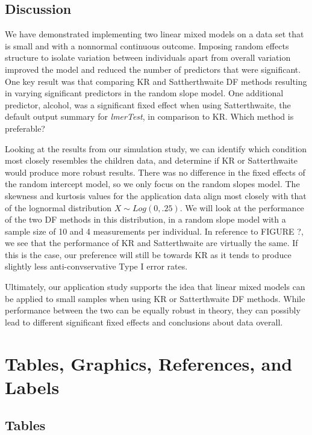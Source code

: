 \documentclass[12pt, twoside]{amherstthesis}
\begin{document}
\hypertarget{discussion-1}{%
\section{Discussion}\label{discussion-1}}

We have demonstrated implementing two linear mixed models on a data set that is small and with a nonnormal continuous outcome. Imposing random effects structure to isolate variation between individuals apart from overall variation improved the model and reduced the number of predictors that were significant. One key result was that comparing KR and Sattherthwaite DF methods resulting in varying significant predictors in the random slope model. One additional predictor, alcohol, was a significant fixed effect when using Satterthwaite, the default output summary for \emph{lmerTest}, in comparison to KR. Which method is preferable?

Looking at the results from our simulation study, we can identify which condition most closely resembles the children data, and determine if KR or Satterthwaite would produce more robust results. There was no difference in the fixed effects of the random intercept model, so we only focus on the random slopes model. The skewness and kurtosis values for the application data align most closely with that of the lognormal distribution \(X\sim\mathit{Log}(0,.25).\) We will look at the performance of the two DF methods in this distribution, in a random slope model with a sample size of 10 and 4 measurements per individual. In reference to FIGURE ?, we see that the performance of KR and Satterthwaite are virtually the same. If this is the case, our preference will still be towards KR as it tends to produce slightly less anti-convservative Type I error rates.

Ultimately, our application study supports the idea that linear mixed models can be applied to small samples when using KR or Satterthwaite DF methods. While performance between the two can be equally robust in theory, they can possibly lead to different significant fixed effects and conclusions about data overall.

\hypertarget{ref-labels}{%
\chapter{Tables, Graphics, References, and Labels}\label{ref-labels}}

\hypertarget{tables}{%
\section{Tables}\label{tables}}
\end{document}
